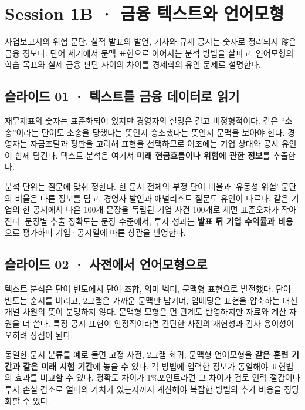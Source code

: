 \documentclass[11pt,a4paper]{article}
\begin{document}
\section{Session 1B · 금융 텍스트와 언어모형}
사업보고서의 위험 문단, 실적 발표의 발언, 기사와 규제 공시는 숫자로 정리되지 않은 금융 정보다. 단어 세기에서 문맥 표현으로 이어지는 분석 방법을 살피고, 언어모형의 학습 목표와 실제 금융 판단 사이의 차이를 경제학의 유인 문제로 설명한다.\par

\subsection{슬라이드 01 · 텍스트를 금융 데이터로 읽기}
재무제표의 숫자는 표준화되어 있지만 경영자의 설명은 길고 비정형적이다. 같은 “소송”이라는 단어도 소송을 당했다는 뜻인지 승소했다는 뜻인지 문맥을 보아야 한다. 경영자는 자금조달과 평판을 고려해 표현을 선택하므로 어조에는 기업 상태와 공시 유인이 함께 담긴다. 텍스트 분석은 여기서 \textbf{미래 현금흐름이나 위험에 관한 정보}를 추출한다.\par

분석 단위는 질문에 맞춰 정한다. 한 문서 전체의 부정 단어 비율과 '유동성 위험' 문단의 비율은 다른 정보를 담고, 경영자 발언과 애널리스트 질문도 유인이 다르다. 같은 기업의 한 공시에서 나온 100개 문장을 독립된 기업 사건 100개로 세면 표준오차가 작아진다. 문장별 추출 정확도는 문장 수준에서, 투자 성과는 \textbf{발표 뒤 기업 수익률과 비용}으로 평가하며 기업·공시일에 따른 상관을 반영한다.\par

\subsection{슬라이드 02 · 사전에서 언어모형으로}
텍스트 분석은 단어 빈도에서 단어 조합, 의미 벡터, 문맥형 표현으로 발전했다. 단어 빈도는 순서를 버리고, 2그램은 가까운 문맥만 남기며, 임베딩은 표현을 압축하는 대신 개별 차원의 뜻이 분명하지 않다. 문맥형 모형은 먼 관계도 반영하지만 자료와 계산 자원을 더 쓴다. 특정 공시 표현이 안정적이라면 간단한 사전의 재현성과 감사 용이성이 오히려 장점이 된다.\par

동일한 문서 분류를 예로 들면 고정 사전, 2그램 회귀, 문맥형 언어모형을 \textbf{같은 훈련 기간과 같은 미래 시험 기간}에 놓을 수 있다. 각 방법에 입력한 정보가 동일해야 표현법의 효과를 비교할 수 있다. 정확도 차이가 1\%포인트라면 그 차이가 검토 인력 절감이나 투자 손실 감소로 얼마의 가치가 있는지까지 계산해야 복잡한 방법의 추가 비용을 정당화할 수 있다.\par
\end{document}
